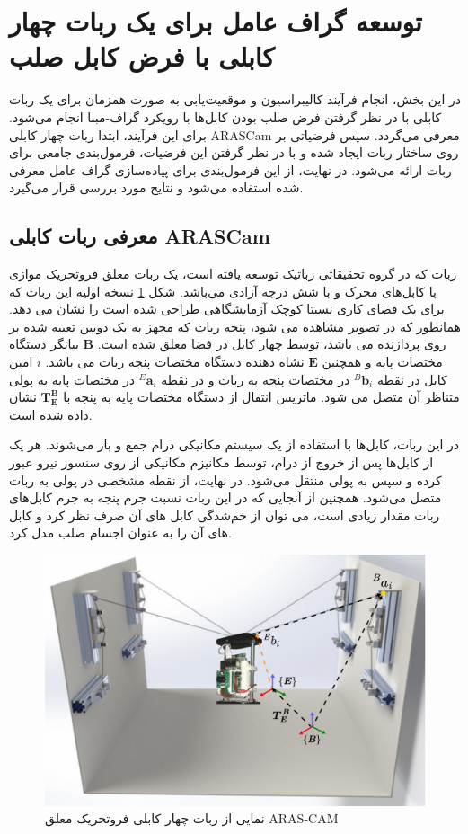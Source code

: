\section{توسعه گراف عامل برای یک ربات چهار کابلی با فرض کابل صلب}
در این بخش، انجام فرآیند کالیبراسیون و موقعیت‌یابی به صورت همزمان برای یک ربات کابلی با در نظر گرفتن فرض صلب بودن کابل‌ها با رویکرد گراف-مبنا انجام می‌شود. برای این فرآیند، ابتدا ربات چهار کابلی ARASCam معرفی می‌گردد. سپس فرضیاتی بر روی ساختار ربات ایجاد شده و با در نظر گرفتن این فرضیات، فرمول‌بندی جامعی برای ربات ارائه می‌شود. در نهایت، از این فرمول‌بندی برای پیاده‌سازی گراف عامل معرفی شده استفاده می‌شود و نتایج مورد بررسی قرار می‌گیرد. 

\subsection{معرفی ربات کابلی ARASCam}
ربات  که در گروه تحقیقاتی رباتیک  توسعه یافته است، یک ربات معلق فروتحریک موازی با کابل‌های محرک و با شش درجه آزادی می‌باشد. شکل 
\ref{fig:arascam}
 نسخه اولیه این  ربات که برای یک فضای کاری نسبتا کوچک آزمایشگاهی طراحی شده است را نشان می دهد. همانطور که در تصویر مشاهده می شود، پنجه ربات که مجهز به یک دوبین تعبیه شده بر روی پردازنده 
می باشد، توسط چهار کابل در فضا معلق شده است. $\boldsymbol{B}$ بیانگر دستگاه مختصات پایه و همچنین $\boldsymbol{E}$ نشاه دهنده دستگاه مختصات پنجه ربات می باشد. $i$ امین کابل در نقطه ${}^B\!\boldsymbol{b}_i$ در مختصات پنجه به ربات و در نقطه ${}^E\!\boldsymbol{a}_i$ در مختصات پایه به پولی متناظر آن متصل می شود. ماتریس انتقال از دستگاه مختصات پایه به پنجه با 
$\boldsymbol{T}^{\boldsymbol{B}}_{\boldsymbol{E}}$
نشان داده شده است.


در این ربات، کابل‌ها با استفاده از یک سیستم مکانیکی درام جمع و باز می‌شوند. هر یک از کابل‌ها پس از خروج از درام، توسط مکانیزم مکانیکی از روی سنسور نیرو عبور کرده و سپس به پولی منتقل می‌شود. در نهایت، از نقطه مشخصی در پولی به ربات متصل می‌شود. همچنین از آنجایی که در این ربات نسبت جرم پنجه به جرم کابل‌های ربات مقدار زیادی است، می توان از خم‌شدگی کابل های آن صرف نظر کرد و کابل های آن را به عنوان اجسام صلب مدل کرد.

\begin{figure}
	\centering
	\includegraphics[width=0.5\linewidth]{img/arascam}
	\caption{نمایی از ربات چهار کابلی فروتحریک معلق ARAS-CAM}
	\label{fig:arascam}
\end{figure}


